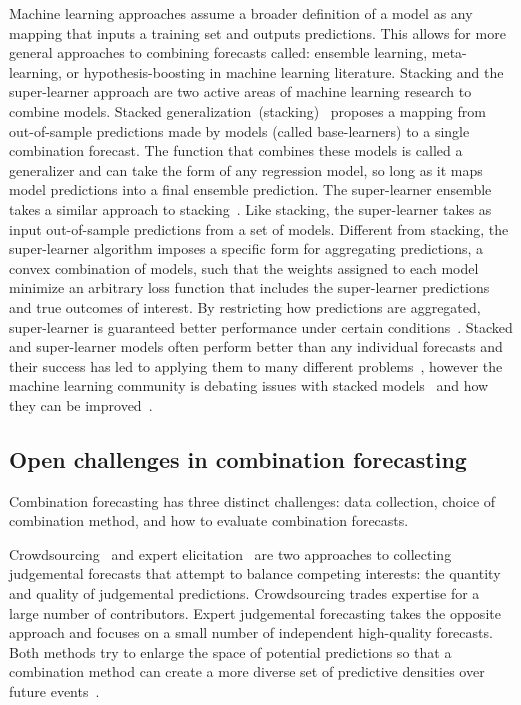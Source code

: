 \documentclass[preprint,authoryear,nonatbib]{elsarticle}
\begin{document}
Machine learning approaches assume a broader definition of a model as any mapping that inputs a training set and outputs predictions.
This allows for more general approaches to combining forecasts called: ensemble learning, meta-learning, or hypothesis-boosting in machine learning literature.
Stacking and the super-learner approach are two active areas of machine learning research to combine models.
%
Stacked generalization~(stacking)~\parencite{wolpert1992stacked} proposes a mapping from out-of-sample predictions made by models (called base-learners) to a single combination forecast.
The function that combines these models is called a generalizer and can take the form of any regression model, so long as it maps model predictions into a final ensemble prediction.
The super-learner ensemble takes a similar approach to stacking~\parencite{van2007super,polley2010super}. 
Like stacking, the super-learner takes as input out-of-sample predictions from a set of models.
Different from stacking, the super-learner algorithm imposes a specific form for aggregating predictions, a convex combination of models, such that the weights assigned to each model minimize an arbitrary loss function that includes the super-learner predictions and true outcomes of interest.
By restricting how predictions are aggregated, super-learner is guaranteed better performance under certain conditions~\parencite{van2007super,polley2010super}. 
%
Stacked and super-learner models often perform better than any individual forecasts and their success has led to applying them to many different problems~\parencite{syarif2012application,sakkis2001stacking,che2011decision,wang2011comparative}, however the machine learning community is debating issues with stacked models~\parencite{ting1999issues} and how they can be improved~\parencite{dvzeroski2004combining}. 

\subsection{Open challenges in combination forecasting}
Combination forecasting has three distinct challenges: data collection, choice of combination method, and how to evaluate combination forecasts.

Crowdsourcing~\parencite{howe2006rise,brabham2013crowdsourcing,abernethy2011collaborative,forlines2014crowdsourcing,moran2016epidemic} and expert elicitation~\parencite{amara1971some,yousuf2007using,o2006uncertain} are two approaches to collecting judgemental forecasts that attempt to balance competing interests: the quantity and quality of judgemental predictions.
Crowdsourcing trades expertise for a large number of contributors.
Expert judgemental forecasting takes the opposite approach and focuses on a small number of independent high-quality forecasts. 
Both methods try to enlarge the space of potential predictions so that a combination method can create a more diverse set of predictive densities over future events~\parencite{dietterich2002ensemble,bates1969combination}.
\end{document}
